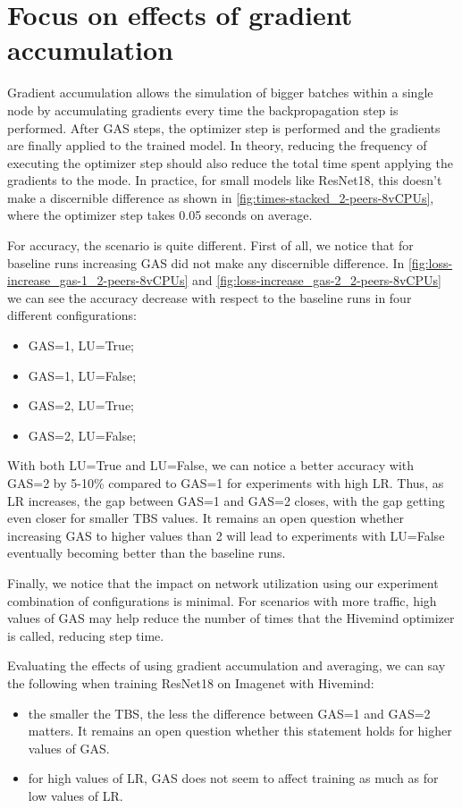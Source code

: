 \section{Focus on effects of gradient accumulation}

Gradient accumulation allows the simulation of bigger batches within a single node by accumulating gradients every time the backpropagation step is performed.
After GAS steps, the optimizer step is performed and the gradients are finally applied to the trained model.
In theory, reducing the frequency of executing the optimizer step should also reduce the total time spent applying the gradients to the mode.
In practice, for small models like ResNet18, this doesn't make a discernible difference as shown in \autoref{fig:times-stacked_2-peers-8vCPUs}, where the optimizer step takes 0.05 seconds on average.

For accuracy, the scenario is quite different.
First of all, we notice that for baseline runs increasing GAS did not make any discernible difference.
In \autoref{fig:loss-increase_gas-1_2-peers-8vCPUs} and \autoref{fig:loss-increase_gas-2_2-peers-8vCPUs} we can see the accuracy decrease with respect to the baseline runs in four different configurations:
\begin{itemize}
    \item GAS=1, LU=True; 
    \item GAS=1, LU=False;
    \item GAS=2, LU=True;
    \item GAS=2, LU=False;
\end{itemize}

With both LU=True and LU=False, we can notice a better accuracy with GAS=2 by 5-10\% compared to GAS=1 for experiments with high LR.
Thus, as LR increases, the gap between GAS=1 and GAS=2 closes, with the gap getting even closer for smaller TBS values.
It remains an open question whether increasing GAS to higher values than 2 will lead to experiments with LU=False eventually becoming better than the baseline runs.

Finally, we notice that the impact on network utilization using our experiment combination of configurations is minimal.
For scenarios with more traffic, high values of GAS may help reduce the number of times that the Hivemind optimizer is called, reducing step time.

Evaluating the effects of using gradient accumulation and averaging, we can say the following when training ResNet18 on Imagenet with Hivemind:
\begin{itemize}
    \item the smaller the TBS, the less the difference between GAS=1 and GAS=2 matters. It remains an open question whether this statement holds for higher values of GAS.
    \item for high values of LR, GAS does not seem to affect training as much as for low values of LR.
\end{itemize}
